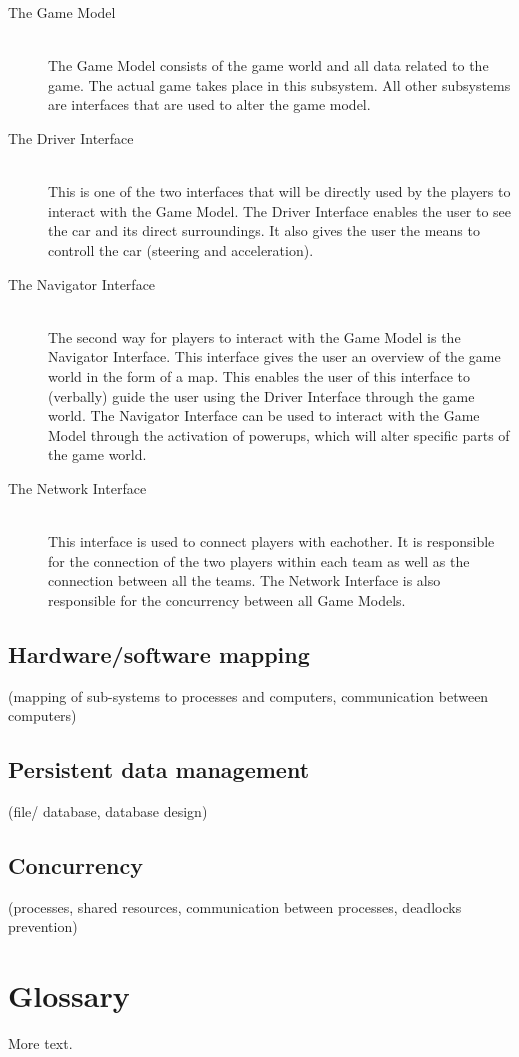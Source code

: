 \documentclass{Article}
\begin{document}
\begin{description}
	
\item[The Game Model] \hfill \\
The Game Model consists of the game world and all data related to the game. The actual game takes place in this subsystem. All other subsystems are interfaces that are used to alter the game model.

\item[The Driver Interface]  \hfill \\
This is one of the two interfaces that will be directly used by the players to interact with the Game Model. The Driver Interface enables the user to see the car and its direct surroundings. It also gives the user the means to controll the car (steering and acceleration). 

\item[The Navigator Interface]  \hfill \\
The second way for players to interact with the Game Model is the Navigator Interface. This interface gives the user an overview of the game world in the form of a map. This enables the user of this interface to (verbally) guide the user using the Driver Interface through the game world. The Navigator Interface can be used to interact with the Game Model through the activation of powerups, which will alter specific parts of the game world.

\item[The Network Interface]  \hfill \\
This interface is used to connect players with eachother. It is responsible for the connection of the two players within each team as well as the connection between all the teams. The Network Interface is also responsible for the concurrency between all Game Models.

\end{description}

\subsection{Hardware/software mapping}

(mapping of sub-systems to processes and computers, communication between computers)

\subsection{Persistent data management}

(file/ database, database design)

\subsection{Concurrency}

(processes, shared resources, communication between processes, deadlocks prevention) 


\section{Glossary}

More text.
\end{document}

